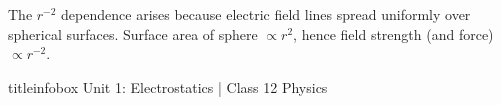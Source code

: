\begin{frame}
\begin{importantbox}
\vspace{0.05cm}
The $r^{-2}$ dependence arises because electric field lines spread uniformly over spherical surfaces. Surface area of sphere $\propto r^2$, hence field strength (and force) $\propto r^{-2}$.
\vspace{0.05cm}
\end{importantbox}

\vfill

\begin{beamercolorbox}[wd=\textwidth,ht=0.5cm,dp=0.1cm,center]{titleinfobox}
    \small\color{coolgray} Unit 1: Electrostatics | Class 12 Physics
\end{beamercolorbox}
\end{frame}

